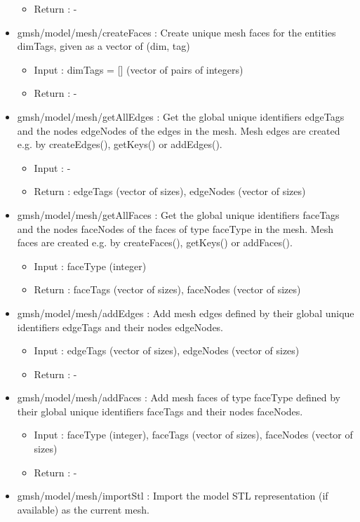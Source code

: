 \documentclass[dvipdfmx, 9pt, a4paper]{article}
\numberwithin{equation}{section}
\begin{document}
\begin{itemize}
\begin{itemize}
\item Return : -
\end{itemize}
\item gmsh/model/mesh/createFaces : Create unique mesh faces for the entities dimTags, given as a vector of (dim, tag)
\begin{itemize}
\item Input : dimTags = [] (vector of pairs of integers)
\item Return : -
\end{itemize}
\item gmsh/model/mesh/getAllEdges : Get the global unique identifiers edgeTags and the nodes edgeNodes of the edges in the mesh. Mesh edges are created e.g. by createEdges(), getKeys() or addEdges().
\begin{itemize}
\item Input : -
\item Return : edgeTags (vector of sizes), edgeNodes (vector of sizes)
\end{itemize}
\item gmsh/model/mesh/getAllFaces : Get the global unique identifiers faceTags and the nodes faceNodes of the faces of type faceType in the mesh. Mesh faces are created e.g. by createFaces(), getKeys() or addFaces().
\begin{itemize}
\item Input : faceType (integer)
\item Return : faceTags (vector of sizes), faceNodes (vector of sizes)
\end{itemize}
\item gmsh/model/mesh/addEdges : Add mesh edges defined by their global unique identifiers edgeTags and their nodes edgeNodes.
\begin{itemize}
\item Input : edgeTags (vector of sizes), edgeNodes (vector of sizes)
\item Return : -
\end{itemize}
\item gmsh/model/mesh/addFaces : Add mesh faces of type faceType defined by their global unique identifiers faceTags and their nodes faceNodes.
\begin{itemize}
\item Input : faceType (integer), faceTags (vector of sizes), faceNodes (vector of sizes)
\item Return : -
\end{itemize}
\item gmsh/model/mesh/importStl : Import the model STL representation (if available) as the current mesh.

\end{itemize}
\end{document}
